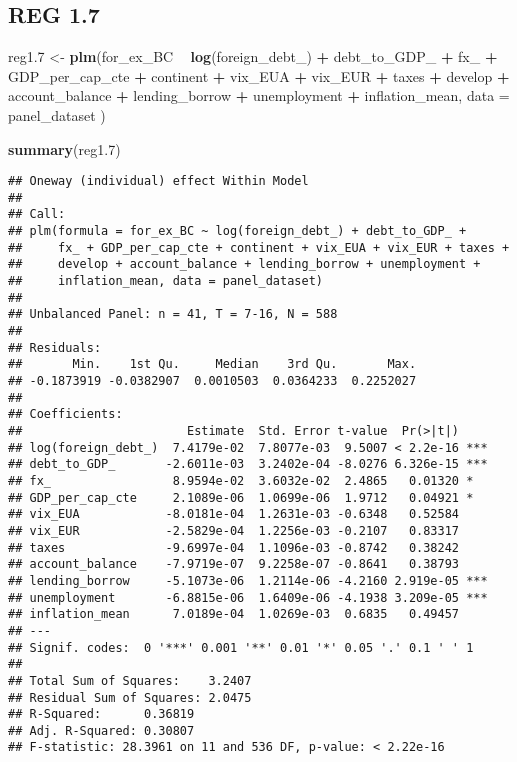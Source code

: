 \documentclass[]{article}
\newenvironment{Shaded}{\begin{snugshade}}{\end{snugshade}}
\newcommand{\KeywordTok}[1]{\textcolor[rgb]{0.13,0.29,0.53}{\textbf{#1}}}
\newcommand{\DataTypeTok}[1]{\textcolor[rgb]{0.13,0.29,0.53}{#1}}
\newcommand{\DecValTok}[1]{\textcolor[rgb]{0.00,0.00,0.81}{#1}}
\newcommand{\StringTok}[1]{\textcolor[rgb]{0.31,0.60,0.02}{#1}}
\newcommand{\OperatorTok}[1]{\textcolor[rgb]{0.81,0.36,0.00}{\textbf{#1}}}
\newcommand{\NormalTok}[1]{#1}
\begin{document}
\subsection{REG 1.7}\label{reg-1.7}

\begin{Shaded}
\begin{Highlighting}[]
\NormalTok{reg1.}\DecValTok{7}\NormalTok{ <-}\StringTok{ }\KeywordTok{plm}\NormalTok{(for_ex_BC }\OperatorTok{~}\StringTok{ }\KeywordTok{log}\NormalTok{(foreign_debt_) }\OperatorTok{+}\StringTok{ }\NormalTok{debt_to_GDP_ }\OperatorTok{+}\StringTok{ }\NormalTok{fx_ }\OperatorTok{+}\StringTok{ }\NormalTok{GDP_per_cap_cte }\OperatorTok{+}\StringTok{ }\NormalTok{continent }\OperatorTok{+}\StringTok{ }\NormalTok{vix_EUA }\OperatorTok{+}\StringTok{ }\NormalTok{vix_EUR }\OperatorTok{+}\StringTok{ }\NormalTok{taxes }\OperatorTok{+}\StringTok{ }\NormalTok{develop }\OperatorTok{+}\StringTok{ }\NormalTok{account_balance }\OperatorTok{+}\StringTok{ }\NormalTok{lending_borrow }\OperatorTok{+}\StringTok{ }\NormalTok{unemployment }\OperatorTok{+}\StringTok{ }\NormalTok{inflation_mean, }\DataTypeTok{data =}\NormalTok{ panel_dataset )}

\KeywordTok{summary}\NormalTok{(reg1.}\DecValTok{7}\NormalTok{)}
\end{Highlighting}
\end{Shaded}

\begin{verbatim}
## Oneway (individual) effect Within Model
## 
## Call:
## plm(formula = for_ex_BC ~ log(foreign_debt_) + debt_to_GDP_ + 
##     fx_ + GDP_per_cap_cte + continent + vix_EUA + vix_EUR + taxes + 
##     develop + account_balance + lending_borrow + unemployment + 
##     inflation_mean, data = panel_dataset)
## 
## Unbalanced Panel: n = 41, T = 7-16, N = 588
## 
## Residuals:
##       Min.    1st Qu.     Median    3rd Qu.       Max. 
## -0.1873919 -0.0382907  0.0010503  0.0364233  0.2252027 
## 
## Coefficients:
##                       Estimate  Std. Error t-value  Pr(>|t|)    
## log(foreign_debt_)  7.4179e-02  7.8077e-03  9.5007 < 2.2e-16 ***
## debt_to_GDP_       -2.6011e-03  3.2402e-04 -8.0276 6.326e-15 ***
## fx_                 8.9594e-02  3.6032e-02  2.4865   0.01320 *  
## GDP_per_cap_cte     2.1089e-06  1.0699e-06  1.9712   0.04921 *  
## vix_EUA            -8.0181e-04  1.2631e-03 -0.6348   0.52584    
## vix_EUR            -2.5829e-04  1.2256e-03 -0.2107   0.83317    
## taxes              -9.6997e-04  1.1096e-03 -0.8742   0.38242    
## account_balance    -7.9719e-07  9.2258e-07 -0.8641   0.38793    
## lending_borrow     -5.1073e-06  1.2114e-06 -4.2160 2.919e-05 ***
## unemployment       -6.8815e-06  1.6409e-06 -4.1938 3.209e-05 ***
## inflation_mean      7.0189e-04  1.0269e-03  0.6835   0.49457    
## ---
## Signif. codes:  0 '***' 0.001 '**' 0.01 '*' 0.05 '.' 0.1 ' ' 1
## 
## Total Sum of Squares:    3.2407
## Residual Sum of Squares: 2.0475
## R-Squared:      0.36819
## Adj. R-Squared: 0.30807
## F-statistic: 28.3961 on 11 and 536 DF, p-value: < 2.22e-16
\end{verbatim}
\end{document}
